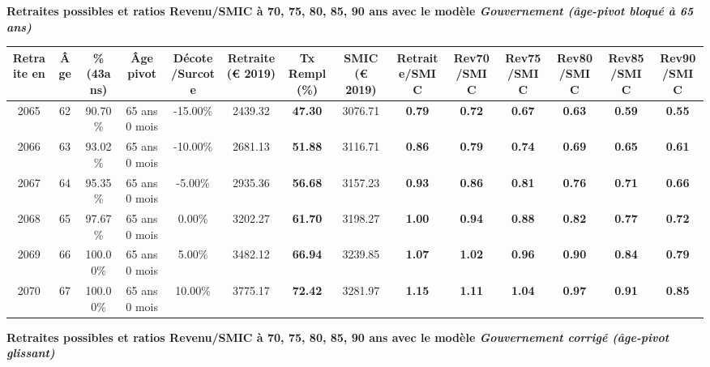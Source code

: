 {\bf \noindent Retraites possibles et ratios Revenu/SMIC à 70, 75, 80, 85, 90 ans avec le modèle \emph{Gouvernement (âge-pivot bloqué à 65 ans)}}  
 
\begin{adjustbox}{max width=\textwidth} 
\begin{tabular}[htb]{|c|c||c|c|c||c|c||c||c|c|c|c|c|c|} 
\hline 
 Retraite en &  Âge &  \%(43ans) &  Âge pivot &  Décote/Surcote &  Retraite (\euro{} 2019) &  Tx Rempl(\%) &  SMIC (\euro{} 2019) &  Retraite/SMIC &  Rev70/SMIC &  Rev75/SMIC &  Rev80/SMIC &  Rev85/SMIC &  Rev90/SMIC \\ 
\hline \hline 
 2065 &  62 &  90.70\% &  65 ans 0 mois &  -15.00\% &  2439.32 &  {\bf 47.30} &  3076.71 &  {\bf {\color{red} 0.79}} &  {\bf {\color{red} 0.72}} &  {\bf {\color{red} 0.67}} &  {\bf {\color{red} 0.63}} &  {\bf {\color{red} 0.59}} &  {\bf {\color{red} 0.55}} \\ 
\hline 
 2066 &  63 &  93.02\% &  65 ans 0 mois &  -10.00\% &  2681.13 &  {\bf 51.88} &  3116.71 &  {\bf {\color{red} 0.86}} &  {\bf {\color{red} 0.79}} &  {\bf {\color{red} 0.74}} &  {\bf {\color{red} 0.69}} &  {\bf {\color{red} 0.65}} &  {\bf {\color{red} 0.61}} \\ 
\hline 
 2067 &  64 &  95.35\% &  65 ans 0 mois &  -5.00\% &  2935.36 &  {\bf 56.68} &  3157.23 &  {\bf {\color{red} 0.93}} &  {\bf {\color{red} 0.86}} &  {\bf {\color{red} 0.81}} &  {\bf {\color{red} 0.76}} &  {\bf {\color{red} 0.71}} &  {\bf {\color{red} 0.66}} \\ 
\hline 
 2068 &  65 &  97.67\% &  65 ans 0 mois &  0.00\% &  3202.27 &  {\bf 61.70} &  3198.27 &  {\bf 1.00} &  {\bf {\color{red} 0.94}} &  {\bf {\color{red} 0.88}} &  {\bf {\color{red} 0.82}} &  {\bf {\color{red} 0.77}} &  {\bf {\color{red} 0.72}} \\ 
\hline 
 2069 &  66 &  100.00\% &  65 ans 0 mois &  5.00\% &  3482.12 &  {\bf 66.94} &  3239.85 &  {\bf 1.07} &  {\bf 1.02} &  {\bf {\color{red} 0.96}} &  {\bf {\color{red} 0.90}} &  {\bf {\color{red} 0.84}} &  {\bf {\color{red} 0.79}} \\ 
\hline 
 2070 &  67 &  100.00\% &  65 ans 0 mois &  10.00\% &  3775.17 &  {\bf 72.42} &  3281.97 &  {\bf 1.15} &  {\bf 1.11} &  {\bf 1.04} &  {\bf {\color{red} 0.97}} &  {\bf {\color{red} 0.91}} &  {\bf {\color{red} 0.85}} \\ 
\hline 
\hline 
\end{tabular} 
\end{adjustbox} 
 
 \vspace{0.1cm} 
{\bf \noindent Retraites possibles et ratios Revenu/SMIC à 70, 75, 80, 85, 90 ans avec le modèle \emph{Gouvernement corrigé (âge-pivot glissant)}}  
 
